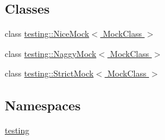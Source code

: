 \subsection*{Classes}
\begin{DoxyCompactItemize}
\item 
class \hyperlink{classtesting_1_1NiceMock}{testing\+::\+Nice\+Mock$<$ Mock\+Class $>$}
\item 
class \hyperlink{classtesting_1_1NaggyMock}{testing\+::\+Naggy\+Mock$<$ Mock\+Class $>$}
\item 
class \hyperlink{classtesting_1_1StrictMock}{testing\+::\+Strict\+Mock$<$ Mock\+Class $>$}
\end{DoxyCompactItemize}
\subsection*{Namespaces}
\begin{DoxyCompactItemize}
\item 
 \hyperlink{namespacetesting}{testing}
\end{DoxyCompactItemize}
